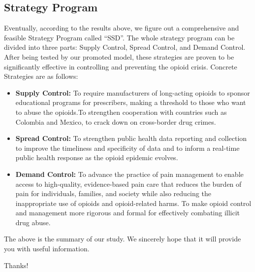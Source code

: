 \documentclass{mcmthesis}
\begin{document}
\subsection*{Strategy Program}
Eventually, according to the results above, we figure out a comprehensive and feasible Strategy Program called ``SSD''. The whole strategy program can be divided into three parts: Supply Control, Spread Control, and Demand Control. After being tested by our promoted model, these strategies are proven to be significantly effective in controlling and preventing the opioid crisis. Concrete Strategies are as follows:
\begin{itemize}
    \item \textbf{Supply Control:} To require manufacturers of long-acting opioids to sponsor educational programs for prescribers, making a threshold to those who want to abuse the opioids.To strengthen cooperation with countries such as Colombia and Mexico, to crack down on cross-border drug crimes.
    \item \textbf{ Spread Control:} To strengthen public health data reporting and collection to improve the timeliness and specificity of data and to inform a real-time public health response as the opioid epidemic evolves.
    \item \textbf{Demand Control:} To advance the practice of pain management to enable access to high-quality, evidence-based pain care that reduces the burden of pain for individuals, families, and society while also reducing the inappropriate use of opioids and opioid-related harms. To make opioid control and management more rigorous and formal for effectively combating illicit drug abuse.
\end{itemize}


The above is the summary of our study. We sincerely hope that it will provide you with useful information.

Thanks!

\newpage



	
\ \newpage
\end{document}

